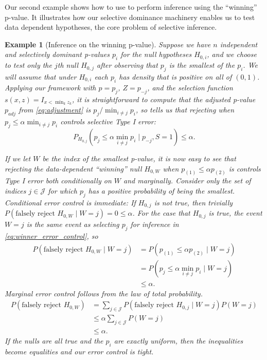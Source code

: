 \documentclass{article}
\newtheorem{example}{Example}
\begin{document}
Our second example shows how to use  to perform inference using the ``winning'' p-value. It illustrates how our selective dominance machinery enables us to test data dependent hypotheses, the core problem of selective inference. 

\begin{example}[Inference on the winning p-value]
    \label{exm:winner} Suppose we have $n$ independent and selectively dominant p-values $p_i$ for the null hypotheses $H_{0, i}$, and we choose to test only the $j$th null $H_{0, j}$ after observing that $p_j$ is the smallest of the $p_i$. We will assume that under $H_{0, i}$ each $p_i$ has density that is positive on all of $(0, 1)$. Applying our framework with $p =p_j$, $Z = p_{-j}$, and the selection function $s(x, z) = I_{x < \min_{k} z_k}$, it is straightforward to compute that the adjusted p-value $p_{adj}$ from \eqref{eq:adjustment} is $p_j/\min_{i \neq j} p_i$, so  tells us that rejecting when $p_j \leq \alpha \min_{i \neq j} p_i$ controls selective Type I error:
    \begin{equation}
        \label{eq:winner_error_control}
        P_{H_{0, j}}(p_j \leq \alpha \min_{i \neq j} p_i \mid  p_{-j}, S = 1) \leq \alpha.
    \end{equation} 

    If we let $W$ be the index of the smallest p-value, it is now easy to see that rejecting the data-dependent ``winning'' null $H_{0, W}$ when $p_{(1)} \leq \alpha p_{(2)}$ is controls Type I error both conditionally on $W$ and marginally. Consider only the set of indices $j \in \mathcal{J}$ for which $p_j$ has a positive probability of being the smallest. Conditional error control is immediate: If $H_{0, j}$ is not true, then trivially $P(\text{falsely reject } H_{0, W} \mid W = j) = 0 \leq \alpha$. For the case that $H_{0, j}$ is true, the event $W=j$ is the same event as selecting $p_j$ for inference in \eqref{eq:winner_error_control}, so 
    \begin{align*}
        P(\text{falsely reject } H_{0, W} \mid W = j) &= P(p_{(1)} \leq \alpha p_{(2)} \mid W = j)\\
        &= P(p_j \leq \alpha \min_{i \neq j} p_i \mid W = j)\\
        &\leq \alpha.
    \end{align*}
     Marginal error control follows from the law of total probability. 
    \begin{align*}
        P(\text{falsely reject } H_{0, W}) &= \sum_{j \in \mathcal{J}} P(\text{falsely reject } H_{0, j} \mid W = j)P(W=j) \\
                                          &\leq \alpha \sum_{j \in \mathcal{J}} P(W=j)\\
                                          &\leq \alpha. 
    \end{align*}
    If the nulls are all true and the $p_i$ are exactly uniform, then the inequalities become equalities and our error control is tight. 
\end{example}
\end{document}
